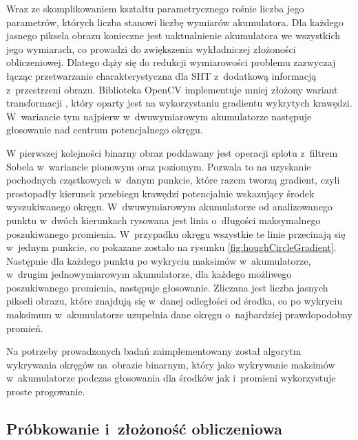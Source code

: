 Wraz ze skomplikowaniem kształtu parametrycznego rośnie liczba jego parametrów, których liczba stanowi liczbę wymiarów akumulatora. Dla każdego jasnego piksela obrazu konieczne jest uaktualnienie akumulatora we wszystkich jego wymiarach, co prowadzi do zwiększenia wykładniczej złożoności obliczeniowej. Dlatego dąży się do redukcji wymiarowości problemu zazwyczaj łącząc przetwarzanie charakterystyczna dla SHT z~dodatkową informacją z~przestrzeni obrazu. Biblioteka OpenCV implementuje mniej złożony wariant transformacji \cite{ito2012detection}, który oparty jest na wykorzystaniu gradientu wykrytych krawędzi. W~wariancie tym najpierw w~dwuwymiarowym akumulatorze następuje głosowanie nad centrum potencjalnego okręgu.

W pierwszej kolejności binarny obraz poddawany jest operacji splotu z~filtrem Sobela w~wariancie pionowym oraz poziomym. Pozwala to na uzyskanie pochodnych cząstkowych w~danym punkcie, które razem tworzą gradient, czyli prostopadły kierunek przebiegu krawędzi potencjalnie wskazujący środek wyszukiwanego okręgu. W~dwuwymiarowym akumulatorze od analizowanego punktu w~dwóch kierunkach rysowana jest linia o~długości maksymalnego poszukiwanego promienia. W~przypadku okręgu wszystkie te linie przecinają się w~jednym punkcie, co pokazane zostało na rysunku \ref{fig:houghCircleGradient}. Następnie dla każdego punktu po wykryciu maksimów w~akumulatorze, w~drugim jednowymiarowym akumulatorze, dla każdego możliwego poszukiwanego promienia, następuje głosowanie. Zliczana jest liczba jasnych pikseli obrazu, które znajdują się w~danej odległości od środka, co po wykryciu maksimum w~akumulatorze uzupełnia dane okręgu o~najbardziej prawdopodobny promień.

Na potrzeby prowadzonych badań zaimplementowany został algorytm wykrywania okręgów na~obrazie binarnym, który jako wykrywanie maksimów w~akumulatorze podczas głosowania dla środków jak i~promieni wykorzystuje proste progowanie.

\subsection{Próbkowanie i~złożoność obliczeniowa}

